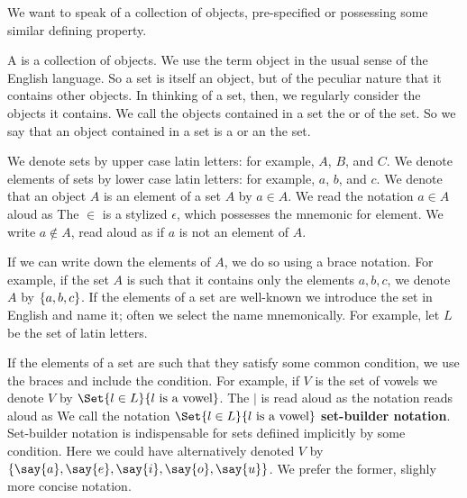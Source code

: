
\sbasic



\sstart



We want to speak of a collection of objects, pre-specified
or possessing some similar defining property.


A  is a collection of objects.
We use the term object in the usual sense of the English language.
So a set is itself an object, but of the peculiar nature that it contains other objects.
In thinking of a set, then, we regularly consider the objects it contains.
We call the objects contained in a set the  or  of the set.
So we say that an object contained in a set is a  or an  the set.


We denote sets by upper case latin letters: for example, $A$, $B$, and $C$.
We denote elements of sets by lower case latin letters: for example, $a$, $b$, and $c$.
We denote that an object $A$ is an element of a set $A$ by $a \in A$.
We read the notation $a \in A$ aloud as 
The $\in$ is a stylized $\epsilon$, which possesses the mnemonic for element.
We write $a \not\in A$, read aloud as  if $a$ is not an element of $A$.

If we can write down the elements of $A$, we do so using a brace notation.
For example, if the set $A$ is such that it contains only the elements $a, b, c$, we denote $A$ by $\{a, b, c\}$.
If the elements of a set are well-known we introduce the set in English and name it; often we select the name mnemonically.
For example, let $L$ be the set of latin letters.

If the elements of a set are such that they satisfy some common condition, we use the braces and include the condition.
For example, if $V$ is the set of vowels we denote $V$ by $\Set{l \in L}{l \text{ is a vowel}}$.
The $\mid$ is read aloud as  the notation reads aloud as 
We call the notation $\Set{l \in L}{l \text{ is a vowel}}$ \textbf{set-builder notation}.
Set-builder notation is indispensable for sets defiined implicitly by some condition.
Here we could have alternatively denoted $V$ by $\set{\say{a},\say{e},\say{i},\say{o},\say{u}}$.
We prefer the former, slighly more concise notation.

